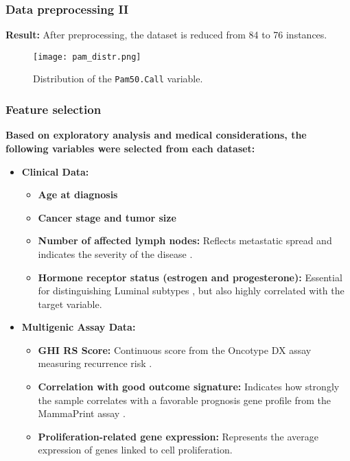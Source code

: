 
\begin{frame}
    \frametitle{Data preprocessing II}
    \vspace{3mm}

    \textbf{Result:} After preprocessing, the dataset is reduced from 84 to 76 instances.
    \vspace{5mm}
    \begin{figure}[h]
        \centering
        \texttt{[image: pam\_distr.png]}
        \caption{Distribution of the \texttt{Pam50.Call} variable.}
        \label{fig:pam50_distribution}
    \end{figure}

    \vfill 
\end{frame}


\begin{frame}
    \frametitle{Feature selection}
    \vspace{3mm}

    \textbf{Based on exploratory analysis and medical considerations, the following variables were selected from each dataset:}
    \vspace{3mm}

    \begin{itemize}
        \item \textbf{Clinical Data:}
        \begin{itemize}
            \item \textbf{Age at diagnosis}
            \item \textbf{Cancer stage and tumor size}
            \item \textbf{Number of affected lymph nodes:} Reflects metastatic spread and indicates the severity of the disease \cite{b5}.
            \item \textbf{Hormone receptor status (estrogen and progesterone):} Essential for distinguishing Luminal subtypes \cite{b6}, but also highly correlated with the target variable.
        \end{itemize}

        \vspace{3mm}
        \item \textbf{Multigenic Assay Data:}
        \begin{itemize}
            \item \textbf{GHI RS Score:} Continuous score from the Oncotype DX assay measuring recurrence risk \cite{b7}. 
            \item \textbf{Correlation with good outcome signature:} Indicates how strongly the sample correlates with a favorable prognosis gene profile from the MammaPrint assay \cite{b8}.
            \item \textbf{Proliferation-related gene expression:} Represents the average expression of genes linked to cell proliferation.
        \end{itemize}
    \end{itemize}

    \vfill 
\end{frame}